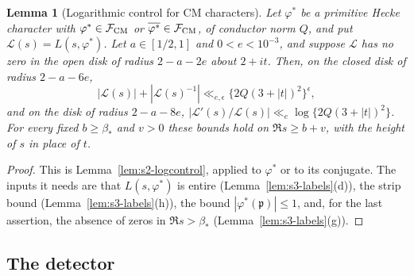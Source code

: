 \documentclass[11pt]{article}
\numberwithin{equation}{section}
\newtheorem{lemma}{Lemma}
\begin{document}
\begin{lemma}[Logarithmic control for CM characters]\label{lem:s3-logcontrol}
Let $\varphi^*$ be a primitive Hecke character with $\varphi^*\in\mathcal F_{\rm CM}$ or
$\overline{\varphi^*}\in\mathcal F_{\rm CM}$, of conductor norm $Q$, and put $\mathcal L(s)=L(s,\varphi^*)$. Let
$a\in[1/2,1]$ and $0<e<10^{-3}$, and suppose $\mathcal L$ has no zero in the open disk of radius $2-a-2e$
about $2+it$. Then, on the closed disk of radius $2-a-6e$,
\begin{equation}\label{eq:d169}
 |\mathcal L(s)|+|\mathcal L(s)^{-1}|\ll_{e,\epsilon}\{2Q(3+|t|)^2\}^\epsilon,
\end{equation}
and on the disk of radius $2-a-8e$, $|\mathcal L'(s)/\mathcal L(s)|\ll_e\log\{2Q(3+|t|)^2\}$. For every
fixed $b\ge\beta_*$ and $v>0$ these bounds hold on $\Re s\ge b+v$, with the height of $s$ in place of $t$.
\end{lemma}

\begin{proof}
This is Lemma~\ref{lem:s2-logcontrol}, applied to $\varphi^*$ or to its conjugate. The inputs it needs are that
$L(s,\varphi^*)$ is entire (Lemma~\ref{lem:s3-labels}(d)), the strip bound (Lemma~\ref{lem:s3-labels}(h)), the
bound $|\varphi^*(\mathfrak p)|\le1$, and, for the last assertion, the absence of zeros in $\Re s>\beta_*$
(Lemma~\ref{lem:s3-labels}(g)).
\end{proof}



\subsection{The detector}
\end{document}
